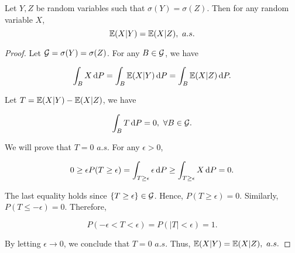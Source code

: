 \begin{theorem}
 Let $Y,Z$ be random variables such that $\sigma(Y)=\sigma(Z)$. Then for any random variable $X$,
 $$\mathbb{E}(X|Y)=\mathbb{E}(X|Z),\,\,a.s.$$
\end{theorem}

\begin{proof}
 Let $\mathcal{G}=\sigma(Y)=\sigma(Z)$. For any $B\in\mathcal{G}$, we have

 $$ \int_B X\,\mathrm{d} P=\int_B \mathbb{E}(X|Y)\,\mathrm{d} P=\int_B \mathbb{E}(X|Z)\,\mathrm{d} P.$$

 Let $T=\mathbb{E}(X|Y)-\mathbb{E}(X|Z)$, we have

 $$\int_B T\,\mathrm{d} P = 0,\,\,\forall B\in\mathcal{G}.$$

 We will prove that $T=0 \,\,a.s.$ For any $\epsilon>0$,

 \begin{align*}
  0\ge\epsilon P(T\ge \epsilon) =\int_{T\ge\epsilon}\epsilon\,\mathrm{d} P\ge \int_{T\ge\epsilon}X\,\mathrm{d} P=0.
 \end{align*}

 The last equality holds since $\{T\ge\epsilon\}\in\mathcal{G}$. Hence, $P(T\ge \epsilon)=0$. Similarly, $P(T\le -\epsilon)=0$. Therefore,

 $$P(-\epsilon < T <\epsilon) = P(|T|<\epsilon) = 1.$$

 By letting $\epsilon\to 0$, we conclude that $T=0\,\,a.s.$ Thus, $\mathbb{E}(X|Y)=\mathbb{E}(X|Z),\,\,a.s.$
\end{proof}


